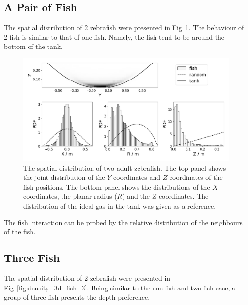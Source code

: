 \documentclass[11pt,twoside]{report}
\begin{document}
\subsection{A Pair of Fish}
\label{section:fish_2_3d}

The spatial distribution of 2 zebrafish were presented in Fig~\ref{fig:density_3d_fish_2}. The behaviour of 2 fish is similar to that of one fish. Namely, the fish tend to be around the bottom of the tank.

\begin{figure}
  \includegraphics[width=\linewidth,outer]{density-two-fish}
  \caption[The 3D spatial distribution of two fish]{The spatial distribution of two adult zebrafish. The top panel shows the joint distribution of the $Y$ coordinates and $Z$ coordinates of the fish positions. The bottom panel shows the distributions of the $X$ coordinates, the planar radius ($R$) and the $Z$ coordinates. The distribution of the ideal gas in the tank was given as a reference.}
  \label{fig:density_3d_fish_2}
\end{figure}

The fish interaction can be probed by the relative distribution of the neighbours of the fish. 


\subsection{Three Fish}
\label{section:fish_3_3d}

The spatial distribution of 2 zebrafish were presented in Fig~\ref{fig:density_3d_fish_3}. Being similar to the one fish and two-fish case, a group of three fish presents the depth preference.
\end{document}
